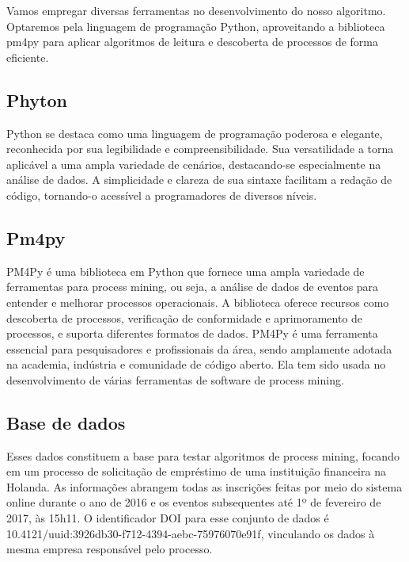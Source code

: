 \documentclass[tcc2]{classe_uftex/uftex}
\begin{document}
Vamos empregar diversas ferramentas no desenvolvimento do nosso algoritmo. Optaremos pela linguagem de programação Python, aproveitando a biblioteca pm4py para aplicar algoritmos de leitura e descoberta de processos de forma eficiente.

\subsection{Phyton}

Python se destaca como uma linguagem de programação poderosa e elegante, reconhecida por sua legibilidade e compreensibilidade. Sua versatilidade a torna aplicável a uma ampla variedade de cenários, destacando-se especialmente na análise de dados. A simplicidade e clareza de sua sintaxe facilitam a redação de código, tornando-o acessível a programadores de diversos níveis.\cite{python2021python}

\subsection{Pm4py}

PM4Py é uma biblioteca em Python que fornece uma ampla variedade de ferramentas para process mining, ou seja, a análise de dados de eventos para entender e melhorar processos operacionais. A biblioteca oferece recursos como descoberta de processos, verificação de conformidade e aprimoramento de processos, e suporta diferentes formatos de dados. PM4Py é uma ferramenta essencial para pesquisadores e profissionais da área, sendo amplamente adotada na academia, indústria e comunidade de código aberto. Ela tem sido usada no desenvolvimento de várias ferramentas de software de process mining.\cite{berti2023pm4py}



\subsection{Base de dados}

Esses dados constituem a base para testar algoritmos de process mining, focando em um processo de solicitação de empréstimo de uma instituição financeira na Holanda. As informações abrangem todas as inscrições feitas por meio do sistema online durante o ano de 2016 e os eventos subsequentes até 1º de fevereiro de 2017, às 15h11. O identificador DOI para esse conjunto de dados é 10.4121/uuid:3926db30-f712-4394-aebc-75976070e91f, vinculando os dados à mesma empresa responsável pelo processo.
\end{document}
